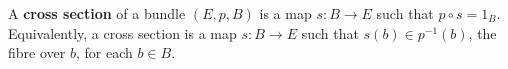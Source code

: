 A \textbf{cross section} of a bundle $(E, p, B)$ is a map $s: B \rightarrow E$ such that $p \circ s = 1_B$. Equivalently, a cross section is a map $s: B \rightarrow E$ such that $s(b) \in p^{-1}(b)$, the fibre over $b$, for each $b \in B$.
